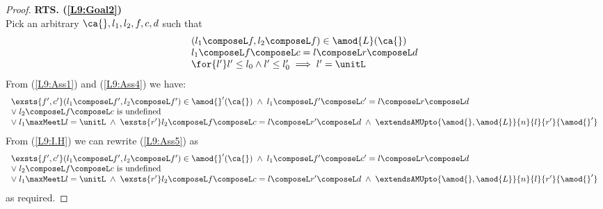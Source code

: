 \begin{lemma}[]
\begin{proof}
\noindent\textbf{RTS. (\ref{L9:Goal2})}\\
Pick an arbitrary $\ca{}, l_1, l_2, f, c, d$ such that
%
\begin{align}
	\begin{array}{l}
		(l_1 \composeL f, l_2 \composeL f) \in \amod{L}(\ca{})\\
  	l_1 \composeL f \composeL c = l \composeL r \composeL d\\
  	\for{l'} l' \leq l_0 \land l' \leq l'_0 \implies l' = \unitL
	\end{array} \label{L9:Ass4}
\end{align}
%
From (\ref{L9:Ass1}) and (\ref{L9:Ass4}) we have:
%
\begin{align}
  \begin{array}{l}
  	\exsts{f', c'} (l_1 \composeL f', l_2 \composeL f') \in \amod{}'(\ca{}) \;\land\; l_1 \composeL f' \composeL c' =  l \composeL r \composeL d\\
		\lor\;l_2 \composeL f \composeL c \text{ is undefined}\\
		\lor\; l_1 \maxMeetL l = \unitL \;\land\; \exsts{r'} l_2 \composeL f \composeL c = l \composeL r' \composeL d \;\land\; \extendsAMUpto{\amod{}, \amod{L}}{n}{l}{r'}{\amod{}'}
  \end{array}\label{L9:Ass5}
\end{align}
%
From (\ref{L9:I.H}) we can rewrite (\ref{L9:Ass5}) as
%
\begin{align}
	\begin{array}{l}
  	\exsts{f', c'} (l_1 \composeL f', l_2 \composeL f') \in \amod{}'(\ca{}) \;\land\; l_1 \composeL f' \composeL c' =  l \composeL r \composeL d\\
		\lor\;l_2 \composeL f \composeL c \text{ is undefined}\\
		\lor\; l_1 \maxMeetL l = \unitL \;\land\; \exsts{r'} l_2 \composeL f \composeL c = l \composeL r' \composeL d \;\land\; \extendsAMUpto{\amod{}, \amod{L}}{n}{l}{r'}{\amod{}'}
  \end{array} \nonumber
\end{align}
%
as required.
\end{proof}
\end{lemma}
%
%
